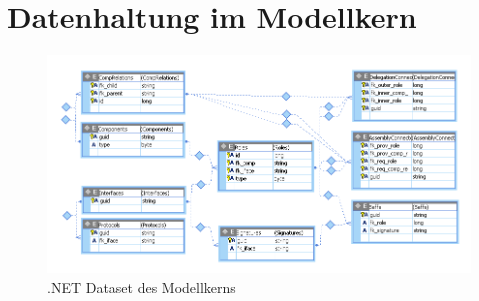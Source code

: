 \section{Datenhaltung im Modellkern}

\begin{figure}[ht]
 \centering \includegraphics[scale=0.44]{dataset.png}
 \caption{.NET Dataset des Modellkerns}
 \label{fig:dataset}
\end{figure}